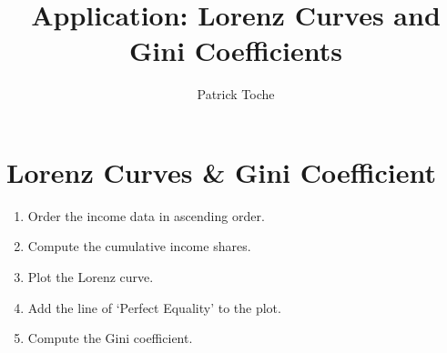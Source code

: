 \documentclass[a4,12pt]{article}%
\title{Application: Lorenz Curves and Gini Coefficients}
\author{Patrick Toche}
\date{}
\begin{document}
\maketitle

\newpage

\section*{Lorenz Curves \& Gini Coefficient}

\begin{enumerate}

\item 
Order the income data in ascending order.

\item 
Compute the cumulative income shares.

\item 
Plot the Lorenz curve.

\item
Add the line of `Perfect Equality' to the plot.

\item 
Compute the Gini coefficient.

\end{enumerate}
\end{document}
